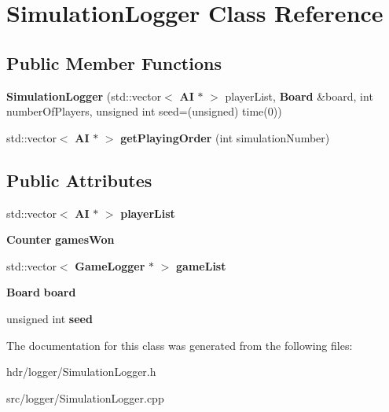 \section{Simulation\-Logger Class Reference}
\label{class_simulation_logger}
\subsection*{Public Member Functions}
\begin{DoxyCompactItemize}
\item 
{\bfseries Simulation\-Logger} (std\-::vector$<$ {\bf A\-I} $\ast$ $>$ player\-List, {\bf Board} \&board, int number\-Of\-Players, unsigned int seed=(unsigned) time(0))\label{class_simulation_logger_a37a43872a7fbee07130e3b39460b54c6}

\item 
std\-::vector$<$ {\bf A\-I} $\ast$ $>$ {\bfseries get\-Playing\-Order} (int simulation\-Number)\label{class_simulation_logger_a4ff55e48a33b19bbd8108d33c9ccf2bf}

\end{DoxyCompactItemize}
\subsection*{Public Attributes}
\begin{DoxyCompactItemize}
\item 
std\-::vector$<$ {\bf A\-I} $\ast$ $>$ {\bfseries player\-List}\label{class_simulation_logger_a344898f3a4cd7df47e8e7dafd0ff5bd6}

\item 
{\bf Counter} {\bfseries games\-Won}\label{class_simulation_logger_ab3ee79eb79f0c07d42ebebebf057587b}

\item 
std\-::vector$<$ {\bf Game\-Logger} $\ast$ $>$ {\bfseries game\-List}\label{class_simulation_logger_abe55e6d0fb8933d3f7f289a1f255f1ad}

\item 
{\bf Board} {\bfseries board}\label{class_simulation_logger_a224021a57c2a155d5bec0548d6368fe1}

\item 
unsigned int {\bfseries seed}\label{class_simulation_logger_a9af9361d2d81c2e0fd47a5fb26285761}

\end{DoxyCompactItemize}


The documentation for this class was generated from the following files\-:\begin{DoxyCompactItemize}
\item 
hdr/logger/Simulation\-Logger.\-h\item 
src/logger/Simulation\-Logger.\-cpp\end{DoxyCompactItemize}
